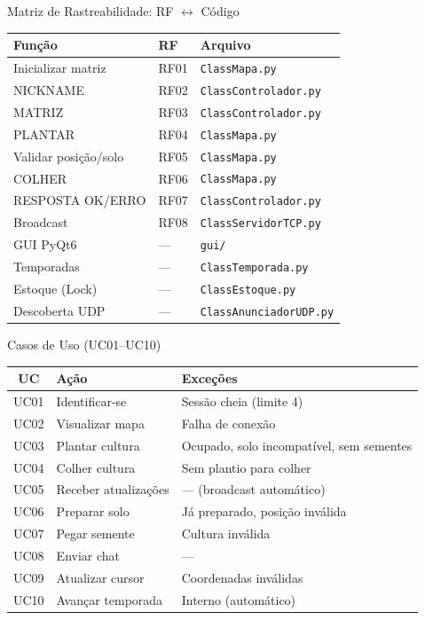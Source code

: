 \documentclass[aspectratio=169]{beamer}
\begin{document}
\begin{frame}{Matriz de Rastreabilidade: RF $\leftrightarrow$ C\'odigo}
  \footnotesize
  \begin{tabular}{>{\raggedright\arraybackslash}p{2.8cm}l>{\raggedright\arraybackslash}p{5cm}}
    \toprule
    \textbf{Fun\c{c}\~ao} & \textbf{RF} & \textbf{Arquivo} \\
    \midrule
    Inicializar matriz & RF01 & \texttt{ClassMapa.py} \\
    NICKNAME & RF02 & \texttt{ClassControlador.py} \\
    MATRIZ & RF03 & \texttt{ClassControlador.py} \\
    PLANTAR & RF04 & \texttt{ClassMapa.py} \\
    Validar posi\c{c}\~ao/solo & RF05 & \texttt{ClassMapa.py} \\
    COLHER & RF06 & \texttt{ClassMapa.py} \\
    RESPOSTA OK/ERRO & RF07 & \texttt{ClassControlador.py} \\
    Broadcast & RF08 & \texttt{ClassServidorTCP.py} \\
    GUI PyQt6 & --- & \texttt{gui/} \\
    Temporadas & --- & \texttt{ClassTemporada.py} \\
    Estoque (Lock) & --- & \texttt{ClassEstoque.py} \\
    Descoberta UDP & --- & \texttt{ClassAnunciadorUDP.py} \\
    \bottomrule
  \end{tabular}
\end{frame}

\begin{frame}{Casos de Uso (UC01--UC10)}
  \footnotesize
  \begin{tabular}{c>{\raggedright\arraybackslash}p{3cm}>{\raggedright\arraybackslash}p{7.5cm}}
    \toprule
    \textbf{UC} & \textbf{A\c{c}\~ao} & \textbf{Exce\c{c}\~oes} \\
    \midrule
    UC01 & Identificar-se & Sess\~ao cheia (limite 4) \\
    UC02 & Visualizar mapa & Falha de conex\~ao \\
    UC03 & Plantar cultura & Ocupado, solo incompat\'ivel, sem sementes \\
    UC04 & Colher cultura & Sem plantio para colher \\
    UC05 & Receber atualiza\c{c}\~oes & --- (broadcast autom\'atico) \\
    UC06 & Preparar solo & J\'a preparado, posi\c{c}\~ao inv\'alida \\
    UC07 & Pegar semente & Cultura inv\'alida \\
    UC08 & Enviar chat & --- \\
    UC09 & Atualizar cursor & Coordenadas inv\'alidas \\
    UC10 & Avan\c{c}ar temporada & Interno (autom\'atico) \\
    \bottomrule
  \end{tabular}
\end{frame}
\end{document}

